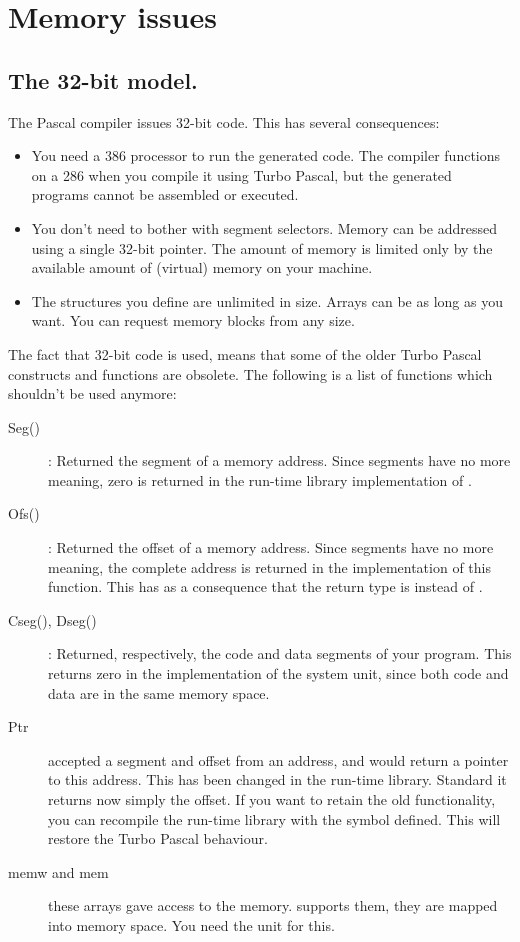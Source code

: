 \documentclass{report}
\begin{document}
\chapter{Memory issues}
\label{ch:Memory}

\section{The 32-bit model.}
\label{se:ThirtytwoBit}
The \fpc Pascal compiler issues 32-bit code. This has several consequences:
\begin{itemize}
\item You need a 386 processor to run the generated code. The
compiler functions on a 286 when you compile it using Turbo Pascal,
but the generated programs cannot be assembled or executed.
\item You don't need to bother with segment selectors. Memory can be
addressed using a single 32-bit pointer.
The amount of memory is limited only by the available amount of (virtual)
memory on your machine.
\item The structures you define are unlimited in size. Arrays can be as long
as you want. You can request memory blocks from any size.
\end{itemize}

The fact that 32-bit code is used, means that some of the older Turbo Pascal
constructs and functions are obsolete. The following is a list of functions
which shouldn't be used anymore:
\begin{description}
\item [Seg()] : Returned the segment of a memory address. Since segments have
no more meaning, zero is returned in the \fpc run-time library implementation of
.
\item [Ofs()] : Returned the offset of a memory address. Since segments have
no more meaning, the complete address is returned in the \fpc implementation
of this function. This has as a consequence that the return type is
 instead of .
\item [Cseg(), Dseg()] : Returned, respectively, the code and data segments
of your program.  This returns zero in the \fpc implementation of the
system unit, since both code and data are in the same memory space.
\item [Ptr] accepted a segment and offset from an address, and would return
a pointer to this address. This has been changed in the run-time library.
Standard it returns now simply the offset. If you want to retain the old
functionality, you can recompile the run-time library with the
 symbol defined. This will restore the Turbo Pascal
behaviour.
\item [memw and mem] these arrays gave access to the \dos memory. \fpc
supports them, they are mapped into \dos memory space. You need the
 unit for this.
\end{description}
\end{document}
